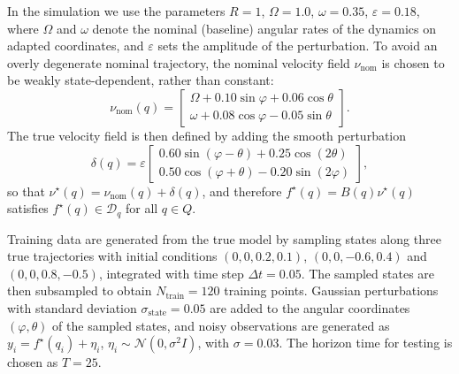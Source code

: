\documentclass[letterpaper, 10 pt, conference]{ieeeconf}
\newcommand{\D}{\mathcal{D}}
\begin{document}
In the simulation we use the parameters $R=1$, $\Omega=1.0$, $\omega=0.35$, $\varepsilon=0.18$, where $\Omega$ and $\omega$ denote the nominal (baseline) angular rates of the dynamics on adapted coordinates, and $\varepsilon$ sets the amplitude of the perturbation. To avoid an overly degenerate nominal trajectory, the nominal velocity field $\nu_{\mathrm{nom}}$ is chosen to be weakly state-dependent, rather than constant:
\begin{equation*}
\nu_{\mathrm{nom}}(q)=
\begin{bmatrix}
\Omega + 0.10\sin\varphi + 0.06\cos\theta\\[0.3em]
\omega + 0.08\cos\varphi - 0.05\sin\theta
\end{bmatrix}.
\label{eq:nu_nom}
\end{equation*}
The true velocity field is then defined by adding the smooth perturbation
\begin{equation*}
\delta(q)=
\varepsilon
\begin{bmatrix}
0.60\sin(\varphi-\theta)+0.25\cos(2\theta)\\[0.3em]
0.50\cos(\varphi+\theta)-0.20\sin(2\varphi)
\end{bmatrix},
\label{eq:delta_vrd}
\end{equation*}
so that
$\nu^\star(q)=\nu_{\mathrm{nom}}(q)+\delta(q)$, and therefore $f^\star(q)=B(q)\nu^\star(q)$ satisfies $f^\star(q)\in \D_q$ for all $q\in Q$.

Training data are generated from the true model by sampling states along three true trajectories with initial conditions
$(0,0,0.2,0.1)$, $(0,0,-0.6,0.4)$ and 
$(0,0,0.8,-0.5)$, integrated with time step $\Delta t=0.05$. The sampled states are then subsampled to obtain $N_{\mathrm{train}}=120$ training points.  Gaussian perturbations with standard deviation $\sigma_{\mathrm{state}}=0.05$ are added to the angular coordinates $(\varphi,\theta)$ of the sampled states, and noisy observations are generated as $y_i = f^\star(q_i) + \eta_i$,
$\eta_i \sim \mathcal{N}(0,\sigma^2 I)$,
with $\sigma=0.03$. The horizon time for testing is chosen as $T=25$.
\end{document}
